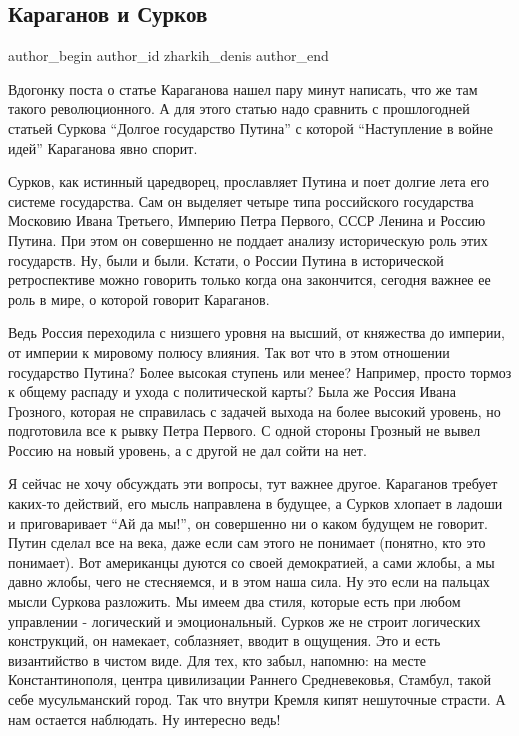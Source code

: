  
 
 
 
 
 
\subsection{Караганов и Сурков}
\label{sec:07_12_2020.fb.zharkih_denis.4.karaganov_i_surkov}
\ifcmt
	author_begin
   author_id zharkih_denis
	author_end
\fi

Вдогонку поста о статье Караганова нашел пару минут написать, что же там такого
революционного. А для этого статью надо сравнить с прошлогодней статьей Суркова
\enquote{Долгое государство Путина} с которой \enquote{Наступление в войне идей} Караганова
явно спорит. 

Сурков, как истинный царедворец, прославляет Путина и поет долгие лета его
системе государства. Сам он выделяет четыре типа российского государства
Московию Ивана Третьего, Империю Петра Первого, СССР Ленина и Россию Путина.
При этом он совершенно не поддает анализу историческую роль этих государств.
Ну, были и были. Кстати, о России Путина в исторической ретроспективе можно
говорить только когда она закончится, сегодня важнее ее роль в мире, о которой
говорит Караганов. 

Ведь Россия переходила с низшего уровня на высший, от княжества до империи, от
империи к мировому полюсу влияния. Так вот что в этом отношении государство
Путина? Более высокая ступень или менее? Например, просто тормоз к общему
распаду и ухода с политической карты? Была же Россия Ивана Грозного, которая не
справилась с задачей выхода на более высокий уровень, но подготовила все к
рывку Петра Первого. С одной стороны Грозный не вывел Россию на новый уровень,
а с другой не дал сойти на нет. 

Я сейчас не хочу обсуждать эти вопросы, тут важнее другое. Караганов требует
каких-то действий, его мысль направлена в будущее, а Сурков хлопает в ладоши и
приговаривает \enquote{Ай да мы!}, он совершенно ни о каком будущем не говорит.
Путин сделал все на века, даже если сам этого не понимает (понятно, кто это
понимает).  Вот американцы дуются со своей демократией, а сами жлобы, а мы
давно жлобы, чего не стесняемся, и в этом наша сила. Ну это если на пальцах
мысли Суркова разложить.  Мы имеем два стиля, которые есть при любом управлении
- логический и эмоциональный. Сурков же не строит логических конструкций, он
намекает, соблазняет, вводит в ощущения. Это и есть византийство в чистом виде.
Для тех, кто забыл, напомню: на месте Константинополя, центра цивилизации
Раннего Средневековья, Стамбул, такой себе мусульманский город. Так что внутри
Кремля кипят нешуточные страсти. А нам остается наблюдать. Ну интересно ведь!
